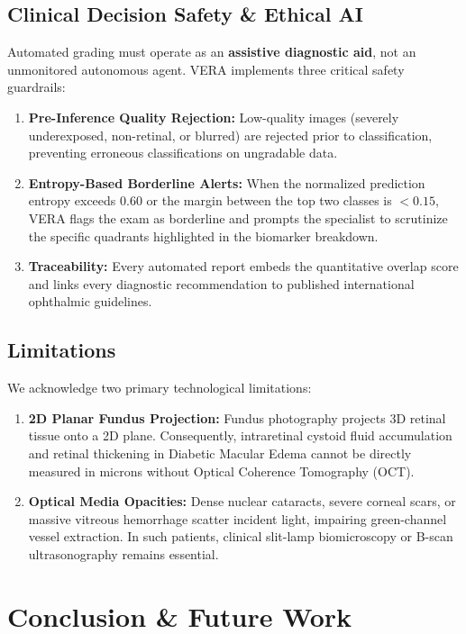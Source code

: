 \documentclass[conference]{IEEEtran}
\begin{document}
\subsection{Clinical Decision Safety \& Ethical AI}
Automated grading must operate as an \textbf{assistive diagnostic aid}, not an unmonitored autonomous agent. VERA implements three critical safety guardrails:
\begin{enumerate}
    \item \textbf{Pre-Inference Quality Rejection:} Low-quality images (severely underexposed, non-retinal, or blurred) are rejected prior to classification, preventing erroneous classifications on ungradable data.
    \item \textbf{Entropy-Based Borderline Alerts:} When the normalized prediction entropy exceeds $0.60$ or the margin between the top two classes is $<0.15$, VERA flags the exam as borderline and prompts the specialist to scrutinize the specific quadrants highlighted in the biomarker breakdown.
    \item \textbf{Traceability:} Every automated report embeds the quantitative overlap score and links every diagnostic recommendation to published international ophthalmic guidelines.
\end{enumerate}

\subsection{Limitations}
We acknowledge two primary technological limitations:
\begin{enumerate}
    \item \textbf{2D Planar Fundus Projection:} Fundus photography projects 3D retinal tissue onto a 2D plane. Consequently, intraretinal cystoid fluid accumulation and retinal thickening in Diabetic Macular Edema cannot be directly measured in microns without Optical Coherence Tomography (OCT).
    \item \textbf{Optical Media Opacities:} Dense nuclear cataracts, severe corneal scars, or massive vitreous hemorrhage scatter incident light, impairing green-channel vessel extraction. In such patients, clinical slit-lamp biomicroscopy or B-scan ultrasonography remains essential.
\end{enumerate}

\section{Conclusion \& Future Work}
\end{document}
